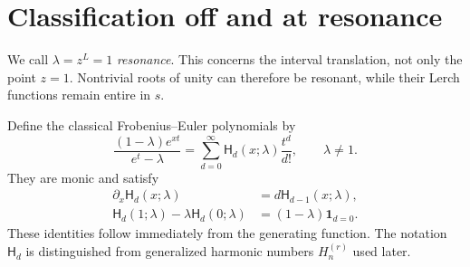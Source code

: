\documentclass[11pt,letterpaper]{article}
\numberwithin{equation}{section}
\theoremstyle{definition}
\theoremstyle{remark}\newtheorem{remark}[theorem]{Remark}
\newcommand{\HFE}{\mathsf H}
\begin{document}
\section{Classification off and at resonance}
\label{pls:sec:classification}

We call $\lambda=z^L=1$ \emph{resonance}. This concerns the interval
translation, not only the point $z=1$. Nontrivial roots of unity can
therefore be resonant, while their Lerch functions remain entire in $s$.

Define the classical Frobenius--Euler polynomials by
\begin{equation}\label{pls:eq:FEgen}
 \frac{(1-\lambda)e^{xt}}{e^t-\lambda}
 =\sum_{d=0}^\infty\HFE_d(x;\lambda)\frac{t^d}{d!},
 \qquad \lambda\ne1.
\end{equation}
They are monic and satisfy
\begin{align}
 \partial_x\HFE_d(x;\lambda)&=d\HFE_{d-1}(x;\lambda),
                 \label{pls:eq:Appell}\\
 \HFE_d(1;\lambda)-\lambda\HFE_d(0;\lambda)
                  &=(1-\lambda)\mathbf1_{d=0}.
                 \label{pls:eq:FEboundary}
\end{align}
These identities follow immediately from the generating function.
The notation $\HFE_d$ is distinguished from generalized harmonic
numbers $H_n^{(r)}$ used later.
\end{document}
